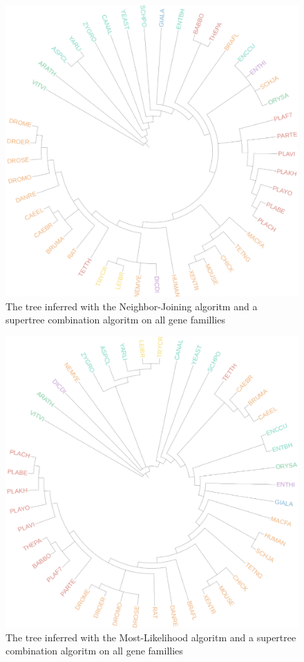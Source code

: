 \documentclass[]{article}
\theoremstyle{definition}
\begin{document}
\begin{figure}[H]
	\includegraphics*[width = \linewidth]{image/NJ_supertree.pdf}
	\caption{ The tree inferred with the Neighbor-Joining algoritm and a supertree combination algoritm on all gene famillies }
\end{figure}

\begin{figure}[H]
	\includegraphics*[width = \linewidth]{image/ML_supertree.pdf}
	\caption{ The tree inferred with the Most-Likelihood algoritm and a supertree combination algoritm on all gene famillies}
\end{figure}
\end{document}
